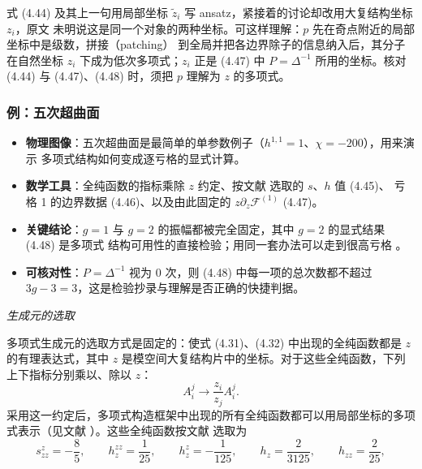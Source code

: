 \begin{yizhu}[含糊点]
式 (4.44) 及其上一句用局部坐标 $\tilde z_i$ 写 ansatz，紧接着的讨论却改用大复结构坐标 $z_i$，原文
未明说这是同一个对象的两种坐标。可这样理解：$p$ 先在奇点附近的局部坐标中是级数，拼接（patching）
到全局并把各边界除子的信息纳入后，其分子在自然坐标 $z_i$ 下成为低次多项式；$z_i$ 正是 (4.47) 中
$P=\Delta^{-1}$ 所用的坐标。核对 (4.44) 与 (4.47)、(4.48) 时，须把 $p$ 理解为 $z$ 的多项式。
\end{yizhu}

\subsubsection{例：五次超曲面}
\label{sec:4.5.3}

\begin{keytakeaways}
  \begin{itemize}[leftmargin=1.4em,itemsep=2pt,topsep=2pt]
    \item \textbf{物理图像}：五次超曲面是最简单的单参数例子（$h^{1,1}=1$、$\chi=-200$），用来演示
          多项式结构如何变成逐亏格的显式计算。
    \item \textbf{数学工具}：全纯函数的指标乘除 $z$ 约定、按文献 \cite{ref25} 选取的 $s$、$h$ 值 (4.45)、
          亏格 1 的边界数据 (4.46)、以及由此固定的 $z\partial_z\mathcal{F}^{(1)}$ (4.47)。
    \item \textbf{关键结论}：$g=1$ 与 $g=2$ 的振幅都被完全固定，其中 $g=2$ 的显式结果 (4.48) 是多项式
          结构可用性的直接检验；用同一套办法可以走到很高亏格 \cite{ref90}。
    \item \textbf{可核对性}：$P=\Delta^{-1}$ 视为 $0$ 次，则 (4.48) 中每一项的总次数都不超过
          $3g-3=3$，这是检验抄录与理解是否正确的快捷判据。
  \end{itemize}
\end{keytakeaways}

\medskip
\noindent\emph{生成元的选取}\par

多项式生成元的选取方式是固定的：使式 (4.31)、(4.32) 中出现的全纯函数都是 $z$ 的有理表达式，其中
$z$ 是模空间大复结构片中的坐标。对于这些全纯函数，下列上下指标分别乘以、除以 $z$：
\[
  A^j_i \to \frac{z_i}{z_j}A^j_i .
\]
采用这一约定后，多项式构造框架中出现的所有全纯函数都可以用局部坐标的多项式表示（见文献
\cite{ref21,ref22,ref25}）。这些全纯函数按文献 \cite{ref25} 选取为
\begin{equation}\tag{4.45}
s^z_{zz} = -\frac{8}{5},
\qquad
h^{zz}_z = \frac{1}{25},
\qquad
h^z_z = -\frac{1}{125},
\qquad
h_z = \frac{2}{3125},
\qquad
h_{zz} = \frac{2}{25},
\end{equation}

